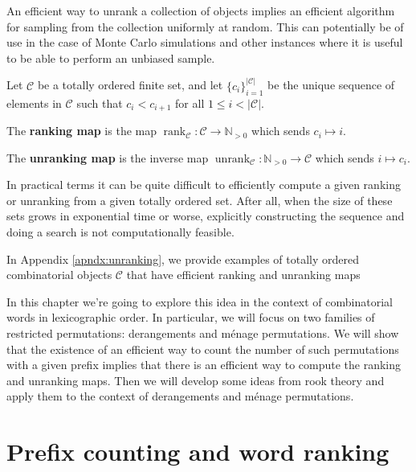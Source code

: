 An efficient way to unrank a collection of objects implies an efficient
algorithm for sampling from the collection uniformly at random. This can
potentially be of use in the case of Monte Carlo simulations and other
instances where it is useful to be able to perform an unbiased sample.

\begin{definition}
  Let $\mathcal C$ be a totally ordered finite set, and
  let $\{c_i\}_{i=1}^{|\mathcal C|}$ be the unique sequence of elements in
  $\mathcal{C}$ such that $c_i < c_{i+1}$ for all $1 \leq i < |\mathcal{C}|$.

  The \textbf{ranking map} is the map
  $\operatorname{rank}_{\mathcal{C}} \colon \mathcal{C} \rightarrow \mathbb N_{>0}$
  which sends $c_i \mapsto i$.

  The \textbf{unranking map} is the inverse map
  $\operatorname{unrank}_{\mathcal{C}} \colon \mathbb N_{>0} \rightarrow \mathcal{C}$
  which sends $i \mapsto c_i$.
\end{definition}

In practical terms it can be quite difficult to efficiently compute a given
ranking or unranking from a given totally ordered set. After all, when the size
of these sets grows in exponential time or worse, explicitly constructing the
sequence and doing a search is not computationally feasible.

In Appendix \ref{apndx:unranking}, we provide examples of totally ordered
combinatorial objects $\mathcal{C}$ that have efficient ranking and unranking
maps

In this chapter we're going to explore this idea in the context of combinatorial
words in lexicographic order. In particular, we will focus on two families of
restricted permutations: derangements and m\'enage permutations. We will show
that the existence of an efficient way to count the number of such permutations
with a given prefix implies that there is an efficient way to compute the
ranking and unranking maps. Then we will develop some ideas from rook theory
and apply them to the context of derangements and m\'enage permutations.
\section{Prefix counting and word ranking}


